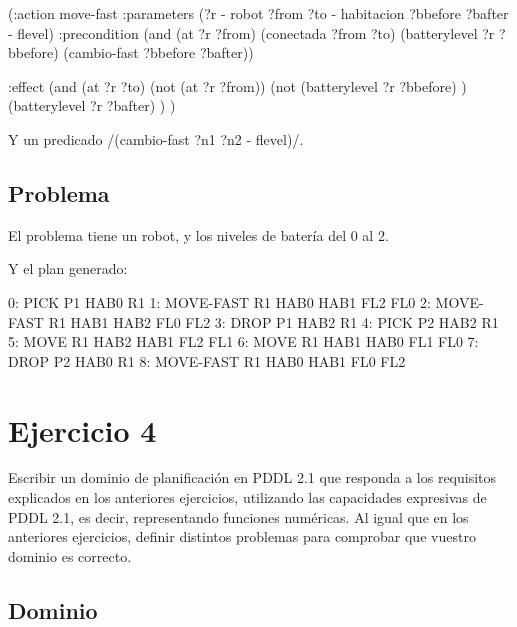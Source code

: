 \documentclass[	DIV=calc,%
							paper=a4,%
							fontsize=11pt]{scrartcl}	 					%
\newcommand{\miit}[1]{{\usefont{T1}{mdugm}{m}{it}\selectfont #1}}
\newcommand{\lispscript}[2]{
    \myLisp[label=#2]{#1}
}
\begin{document}
\begin{newlispcode}
	(:action move-fast
	  :parameters (?r - robot ?from ?to - habitacion ?bbefore ?bafter - flevel)
	  :precondition (and
	                  (at ?r ?from)
	                  (conectada ?from ?to)
	                  (batterylevel ?r ?bbefore)
	                  (cambio-fast ?bbefore ?bafter))

	  :effect (and
	            (at ?r ?to)
	            (not (at ?r ?from))
	            (not (batterylevel ?r ?bbefore) )
	            (batterylevel ?r ?bafter)
	            )
	)
\end{newlispcode}

Y un predicado \newlispinline/(cambio-fast ?n1 ?n2 - flevel)/.

\subsection{Problema}
\label{sub:Problema}

El problema tiene un robot, y los niveles de batería del 0 al 2.

\lispscript{../p0e3.pddl}{p0e3.pddl}

Y el plan generado:

\begin{bashcode}
	        0: PICK P1 HAB0 R1
	        1: MOVE-FAST R1 HAB0 HAB1 FL2 FL0
	        2: MOVE-FAST R1 HAB1 HAB2 FL0 FL2
	        3: DROP P1 HAB2 R1
	        4: PICK P2 HAB2 R1
	        5: MOVE R1 HAB2 HAB1 FL2 FL1
	        6: MOVE R1 HAB1 HAB0 FL1 FL0
	        7: DROP P2 HAB0 R1
	        8: MOVE-FAST R1 HAB0 HAB1 FL0 FL2
\end{bashcode}

\section{Ejercicio 4}
\label{sec:Ejercicio 4}

\miit{Escribir un dominio de planificación en PDDL 2.1 que responda a los requisitos
explicados en los anteriores ejercicios, utilizando las capacidades expresivas de PDDL
2.1, es decir, representando funciones numéricas. Al igual que en los anteriores
ejercicios, definir distintos problemas para comprobar que vuestro dominio es
correcto.}

\subsection{Dominio}
\label{sub:Dominio}
\end{document}
